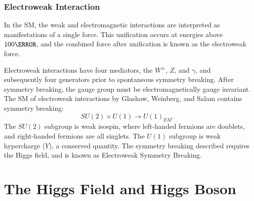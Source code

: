         \subsubsection{Electroweak Interaction} \label{sssec:ew-theory}

        In the \gls{SM}, the weak and electromagnetic interactions are interpreted as manifestations of a single force. This unification occurs at energies above $\unit{100}{\GeV}$, and the combined force after unification is known as the electroweak force.

        Electroweak interactions have four mediators, the $W^{\pm}$, $Z$, and $\gamma$, and subsequently four generators prior to spontaneous symmetry breaking. After symmetry breaking, the gauge group must be electromagnetically gauge invariant. The \gls{SM} of electroweak interactions by Glashow, Weinberg, and Salam \cite{Glashow:1959,Weinberg:1967,Salam1959} contains symmetry breaking:
        \begin{equation}
            SU(2) \times U(1) \rightarrow U(1)_{EM}.
        \end{equation}
        The $SU(2)$ subgroup is weak isospin, where left-handed fermions are doublets, and right-handed fermions are all singlets. The $U(1)$ subgroup is weak hypercharge ($Y$), a conserved quantity. The symmetry breaking described requires the Higgs field, and is known as Electroweak Symmetry Breaking.

\section{The Higgs Field and Higgs Boson}

